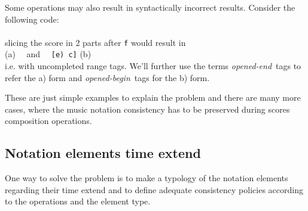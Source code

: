 \documentclass{article}
\newcommand{\code}[1]	{{\small \texttt{#1}}}
\newcommand{\gtag}[1]	{$\backslash$\code{#1}}
\newcommand{\oend}		{\emph{opened-end}}
\newcommand{\obeg}		{\emph{opened-begin}}
\newcommand{\codeindent}	{\\ \hspace*{9mm}}
\begin{document}
Some operations may also result in syntactically incorrect results. Consider the following code:
\codeindent \code{[g \gtag{slur}(f e) c]} \\
slicing the score in 2 parts after \code{f} would result in 
\codeindent \code{[g \gtag{slur}(f]} (a) \ \  and \ \  \code{[e) c]} (b) \\
i.e. with uncompleted range tags. We'll further use the terms \oend\ tags to refer the a) form and \obeg\ tags for the b) form.

These are just simple examples to explain the problem and there are many more cases, where the music notation consistency has to be preserved during scores composition operations.

\subsection{Notation elements time extend}
One way to solve the problem is to make a typology of the notation elements regarding their time extend and to define adequate consistency policies according to the operations and the element type.
\end{document}
